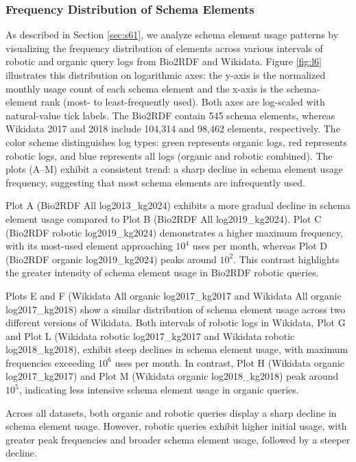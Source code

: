 \documentclass[sw]{iosart2x}
\begin{document}
\subsubsection{Frequency Distribution of Schema Elements}
As described in Section \ref{sec:s61}, we analyze schema element usage patterns by visualizing the frequency distribution of elements across various intervals of robotic and organic query logs from Bio2RDF and Wikidata. Figure \ref{fig:l6} illustrates this distribution on logarithmic axes: the y-axis is the normalized monthly usage count of each schema element and the x-axis is the schema-element rank (most- to least-frequently used). Both axes are log-scaled with natural-value tick labels. The Bio2RDF contain 545 schema elements, whereas Wikidata 2017 and 2018 include 104,314 and 98,462 elements, respectively. The color scheme distinguishes log types: green represents organic logs, red represents robotic logs, and blue represents all logs (organic and robotic combined). The plots (A–M) exhibit a consistent trend: a sharp decline in schema element usage frequency, suggesting that most schema elements are infrequently used.

Plot A (Bio2RDF All log2013\_kg2024) exhibits a more gradual decline in schema element usage compared to Plot B (Bio2RDF All log2019\_kg2024). Plot C (Bio2RDF robotic log2019\_kg2024) demonstrates a higher maximum frequency, with its most-used element approaching $10^{4}$ uses per month, whereas Plot D (Bio2RDF organic log2019\_kg2024) peaks around $10^{2}$. This contrast highlights the greater intensity of schema element usage in Bio2RDF robotic queries.

Plots E and F (Wikidata All organic log2017\_kg2017 and Wikidata All organic log2017\_kg2018) show a similar distribution of schema element usage across two different versions of Wikidata. Both intervals of robotic logs in Wikidata, Plot G and Plot L (Wikidata robotic log2017\_kg2017 and Wikidata robotic log2018\_kg2018), exhibit steep declines in schema element usage, with maximum frequencies exceeding $10^{6}$ uses per month. In contrast, Plot H (Wikidata organic log2017\_kg2017) and Plot M (Wikidata organic log2018\_kg2018) peak around $10^{5}$, indicating less intensive schema element usage in organic queries.

Across all datasets, both organic and robotic queries display a sharp decline in schema element usage. However, robotic queries exhibit higher initial usage, with greater peak frequencies and broader schema element usage, followed by a steeper decline.
\end{document}
